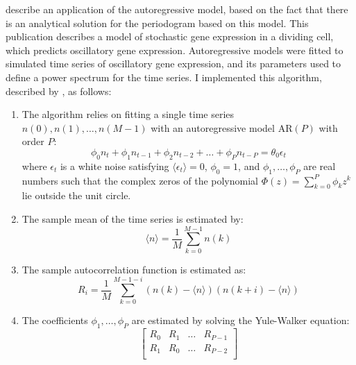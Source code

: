 \parencite{jiaFrequencyDomainAnalysis2021} describe an application of the autoregressive model, based on the fact that there is an analytical solution for the periodogram based on this model.
This publication describes a model of stochastic gene expression in a dividing cell, which predicts oscillatory gene expression.
Autoregressive models were fitted to simulated time series of oscillatory gene expression, and its parameters used to define a power spectrum for the time series.
I implemented this algorithm, described by \textcite{jiaFrequencyDomainAnalysis2020}, as follows:

\begin{enumerate}
  \item The algorithm relies on fitting a single time series $n(0), n(1), \ldots , n(M-1)$ with an autoregressive model $\mathrm{AR}(P)$ with order $P$:
        \begin{equation}
          \label{eq:ar-model}
          \phi_{0}n_{t} + \phi_{1}n_{t-1} + \phi_{2}n_{t-2} + \ldots + \phi_{P}n_{t-P} = \theta_{0}\epsilon_{t}
        \end{equation}
        where $\epsilon_{t}$ is a white noise satisfying $\langle \epsilon_{t} \rangle = 0$,
        $\phi_{0} = 1$, and
        $\phi_{1}, \ldots , \phi_{P}$ are real numbers such that the complex zeros of the polynomial $\Phi (z) = \sum_{k=0}^{P} \phi_{k}z^{k}$ lie outside the unit circle.
  \item The sample mean of the time series is estimated by:
        \begin{equation}
          \label{eq:ar-mean}
          \langle n \rangle = \frac{1}{M} \sum_{k=0}^{M-1}n(k)
        \end{equation}
  \item The sample autocorrelation function is estimated as:
        \begin{equation}
          \label{eq:ar-acf}
          R_{i} = \frac{1}{M} \sum_{k=0}^{M-1-i}(n(k) - \langle n \rangle)(n(k+i) - \langle n \rangle)
        \end{equation}
  \item The coefficients $\phi_{1}, \ldots , \phi_{P}$ are estimated by solving the Yule-Walker equation:
        \begin{equation}
          \label{eq:ar-yule-walker}
          \begin{bmatrix}
            R_{0} & R_{1} & \dots & R_{P-1} \\
            R_{1} & R_{0} & \dots & R_{P-2} \\

\end{bmatrix}
\end{equation}
\end{enumerate}
